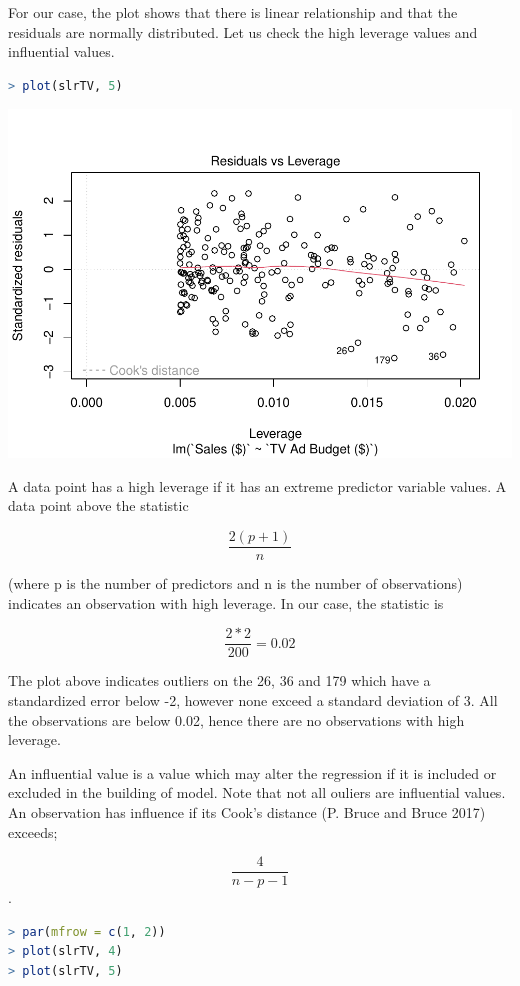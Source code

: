 \documentclass[
]{article}
\begin{document}
For our case, the plot shows that there is linear relationship and that
the residuals are normally distributed. Let us check the high leverage
values and influential values.

\begin{lstlisting}[language=R]
> plot(slrTV, 5)
\end{lstlisting}

\includegraphics{Types-of-Regressions_files/figure-latex/unnamed-chunk-17-1.pdf}

A data point has a high leverage if it has an extreme predictor variable
values. A data point above the statistic

\[\frac{2(p+1)}{n}\]

(where p is the number of predictors and n is the number of
observations) indicates an observation with high leverage. In our case,
the statistic is

\[\frac{2*2}{200}=0.02\]

The plot above indicates outliers on the 26, 36 and 179 which have a
standardized error below -2, however none exceed a standard deviation of
3. All the observations are below 0.02, hence there are no observations
with high leverage.

An influential value is a value which may alter the regression if it is
included or excluded in the building of model. Note that not all ouliers
are influential values. An observation has influence if its Cook's
distance (P. Bruce and Bruce 2017) exceeds;

\[\frac{4}{n-p-1}\].

\begin{lstlisting}[language=R]
> par(mfrow = c(1, 2))
> plot(slrTV, 4)
> plot(slrTV, 5)
\end{lstlisting}
\end{document}
